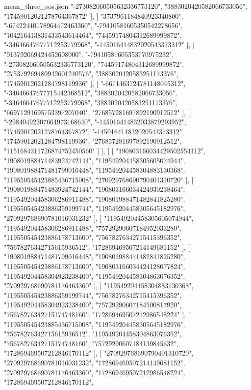 \begin{filecontents*}[overwrite]{mean_three_sos.json}
    "-273082060505632336773120",
    "3883020420582066733056",
    "17459012021278764367872"
   ],
   [
    "3737961184840923340800",
    "-67422440178964472463360",
    "-79410581605350542278656",
    "104216413831433543614464",
    "74459174804312689999872",
    "-34646647677712253779968",
    "-145016414832020543373312"
   ],
   [
    "913792069424452608000",
    "-79410581605353770975232",
    "-273082060505632336773120",
    "74459174804312689999872",
    "275379269480942601240576",
    "3883020420583251173376",
    "17459012021284798119936"
   ],
   [
    "-6671463724781148045312",
    "-34646647677715442368512",
    "3883020420582066733056",
    "-34646647677712253779968",
    "3883020420583251173376",
    "66971291695753397207040",
    "276857281697892190912512"
   ],
   [
    "-29840492307664973168640",
    "-145016414832033879293952",
    "17459012021278764367872",
    "-145016414832020543373312",
    "17459012021284798119936",
    "276857281697892190912512",
    "1151684311726874752450560"
   ]
  ],
  [
   [
    "190803166034429502554112",
    "190801988471483924742144",
    "119549204458305605074944",
    "190801988471481799016448",
    "119549204458304883130368",
    "119550545423885436715008",
    "270929768690790401310720"
   ],
   [
    "190801988471483924742144",
    "190803166034424930238464",
    "119549204458306286911488",
    "190801988471482841825280",
    "119550545423886359199744",
    "119549204458305645182976",
    "270929768690781016031232"
   ],
   [
    "119549204458305605074944",
    "119549204458306286911488",
    "75729290607184952033280",
    "119550545423886178713600",
    "75678276342715415396352",
    "75678276342715615936512",
    "172869469507214149681152"
   ],
   [
    "190801988471481799016448",
    "190801988471482841825280",
    "119550545423886178713600",
    "190803166034424128077824",
    "119549204458304923238400",
    "119549204458304863076352",
    "270929768690781176463360"
   ],
   [
    "119549204458304883130368",
    "119550545423886359199744",
    "75678276342715415396352",
    "119549204458304923238400",
    "75729290607184500817920",
    "75678276342715174748160",
    "172869469507212986548224"
   ],
   [
    "119550545423885436715008",
    "119549204458305645182976",
    "75678276342715615936512",
    "119549204458304863076352",
    "75678276342715174748160",
    "75729290607184139845632",
    "172869469507212846170112"
   ],
   [
    "270929768690790401310720",
    "270929768690781016031232",
    "172869469507214149681152",
    "270929768690781176463360",
    "172869469507212986548224",
    "172869469507212846170112",

\end{filecontents*}
